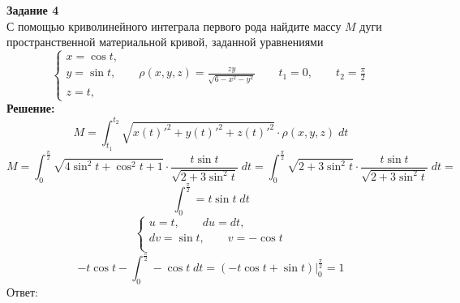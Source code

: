 \documentclass[12pt,fleqn]{article}
\begin{document}
\begin{flushleft}
    \textbf{Задание 4} \\
    С помощью криволинейного интеграла первого рода найдите массу $M$ дуги пространственной материальной кривой, заданной уравнениями
    \[
    \begin{cases}
        x = \cos{t}, \\
        y = \sin{t}, \qquad \rho(x, y, z) = \frac{zy}{\sqrt{6 - x^2 - y^2}} \qquad t_1 = 0, \qquad t_2 = \frac{\pi}{2} \\
        z = t, \
    \end{cases}
    \]
    \textbf{Решение:} \\
    \[ M = \int_{t_1}^{t_2} \sqrt{x(t)'^2 + y(t)'^2 + z(t)'^2} \cdot \rho(x, y, z) \; dt \]
    \[ M = \int_{0}^{\frac{\pi}{2}} \sqrt{4\sin^2{t} + \cos^2{t} + 1} \cdot \frac{t \sin{t}}{\sqrt{2 + 3\sin^2{t}}} \; dt = \int_{0}^{\frac{\pi}{2}} \sqrt{2 + 3\sin^2{t}} \cdot \frac{t \sin{t}}{\sqrt{2 + 3\sin^2{t}}} \; dt = \]
    \[ \int_{0}^{\frac{\pi}{2}} = t \sin{t} \; dt\]
    \[
    \begin{cases}
        u = t, \qquad du = dt, \\
        dv = \sin{t}, \qquad v = -\cos{t} \\
    \end{cases}
    \]
    \[ -t\cos{t} - \int_{0}^{\frac{\pi}{2}} -\cos{t} \; dt = (-t\cos{t} + \sin{t})\Big|_0^{\frac{\pi}{2}} = 1 \]
    Ответ: \boxed{M = 1} \\
\end{flushleft}
\end{document}
